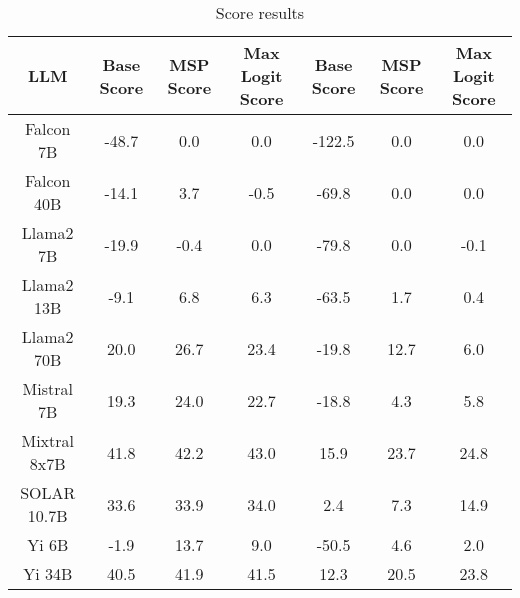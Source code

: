 \renewcommand\arraystretch{1.2}
\begin{table*}
\centering
\begin{tabular}{c|c|c|c|c|c|c}
LLM & Base Score & MSP Score & Max Logit Score & Base Score & MSP Score & Max Logit Score\\ \hline
Falcon 7B & -48.7 & 0.0 & 0.0 & -122.5 & 0.0 & 0.0\\
Falcon 40B & -14.1 & 3.7 & -0.5 & -69.8 & 0.0 & 0.0\\
Llama2 7B & -19.9 & -0.4 & 0.0 & -79.8 & 0.0 & -0.1\\
Llama2 13B & -9.1 & 6.8 & 6.3 & -63.5 & 1.7 & 0.4\\
Llama2 70B & 20.0 & 26.7 & 23.4 & -19.8 & 12.7 & 6.0\\
Mistral 7B & 19.3 & 24.0 & 22.7 & -18.8 & 4.3 & 5.8\\
Mixtral 8x7B & 41.8 & 42.2 & 43.0 & 15.9 & 23.7 & 24.8\\
SOLAR 10.7B & 33.6 & 33.9 & 34.0 & 2.4 & 7.3 & 14.9\\
Yi 6B & -1.9 & 13.7 & 9.0 & -50.5 & 4.6 & 2.0\\
Yi 34B & 40.5 & 41.9 & 41.5 & 12.3 & 20.5 & 23.8\\
\hline
\end{tabular}
\caption{Score results}
\end{table*}
\label{tab:score}
